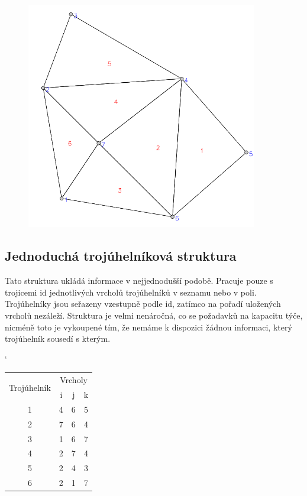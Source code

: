 \documentclass[12pt,a4paper]{article}
\begin{document}
\begin{figure}[h!]
\centering
\includegraphics[width=0.9\textwidth]{../img/struct_triangulace.png}
\label{fig:struct_triangulace}
\end{figure}

\subsection{Jednoduchá trojúhelníková struktura}
Tato struktura ukládá informace v nejjednodušší podobě. Pracuje pouze s trojicemi id jednotlivých vrcholů trojúhelníků v seznamu nebo v poli. Trojúhelníky jsou seřazeny vzestupně podle id, zatímco na pořadí uložených vrcholů nezáleží. Struktura je velmi nenáročná, co se požadavků na kapacitu týče, nicméně toto je vykoupené tím, že nemáme k dispozici žádnou informaci, který trojúhelník sousedí s kterým.

\begin{table}[h]
\catcode`
\begin{tabular}{|c||c|c|c|}
\hline
\multirow{2}{*}{Trojúhelník} & \multicolumn{3}{c|}{Vrcholy} \\ \cline{2-4} 
                             & i        & j       & k       \\ \hline \hline
1                            & 4        & 6       & 5       \\ \hline
2                            & 7        & 6       & 4       \\ \hline
3                            & 1        & 6       & 7       \\ \hline
4                            & 2        & 7       & 4       \\ \hline
5                            & 2        & 4       & 3       \\ \hline
6                            & 2        & 1       & 7       \\ \hline
\end{tabular}
\end{table}
\end{document}
